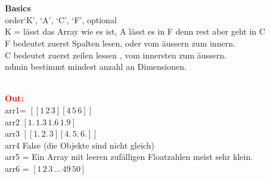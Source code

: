\\
\vspace{0.5cm}
\\\vspace{0.1cm}
\textbf{Basics}
\\
order{‘K’, ‘A’, ‘C’, ‘F’}, optional\\
K = lässt das Array wie es ist, A lässt es in F denn rest aber geht in C\\
F bedeutet zuerst Spalten lesen, oder vom äussern zum innern.\\
C bedeutet zuerst zeilen lessen , vom innersten zum äussern.\\
ndmin bestimmt mindest anzahl an Dimensionen.\\
\\
\begin{minipage}[h]{10cm}
	
\end{minipage}
\begin{minipage}[h]{8cm}
	\textcolor{red}{\textbf{Out:}} \\
	arr1= $[[1\, 2\, 3][4\, 5\, 6]]$
	\\ arr2 $[1.\,  1.3\, 1.6\, 1.9]$
	\\ arr3 $[[1.\, 2.\, 3][4.\, 5.\, 6.]]$
	\\ arr4 False (die Objekte sind nicht gleich)
	\\ arr5 = Ein Array mit leeren zufälligen Floatzahlen meist sehr klein.
	\\ arr6 = $[1\, 2\, 3 \,\dots\, 49\, 50]$
	\\ 
\end{minipage}
\newpage
